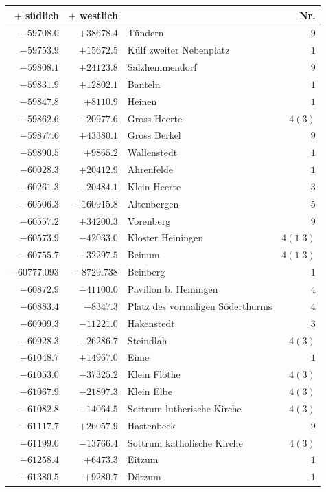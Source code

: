 \begin{center}\begingroup\fontsize{8}{9}\selectfont
\setlength{\tabcolsep}{4pt}
\begin{tabular}{r|r|p{170pt}|r}\hline
\(+\) südlich&\(+\) westlich&&Nr.\\\hline
\(-59708.0\)&\(+38678.4\)&Tündern&\(9\)\\
\(-59753.9\)&\(+15672.5\)&Külf zweiter Nebenplatz&\(1\)\\
\(-59808.1\)&\(+24123.8\)&Salzhemmendorf&\(9\)\\
\(-59831.9\)&\(+12802.1\)&Banteln&\(1\)\\
\(-59847.8\)&\(+8110.9\)&Heinen&\(1\)\\
\(-59862.6\)&\(-20977.6\)&Gross Heerte&\(4 (3)\)\\
\(-59877.6\)&\(+43380.1\)&Gross Berkel&\(9\)\\
\(-59890.5\)&\(+9865.2\)&Wallenstedt&\(1\)\\
\(-60028.3\)&\(+20412.9\)&Ahrenfelde&\(1\)\\
\(-60261.3\)&\(-20484.1\)&Klein Heerte&\(3\)\\
\(-60506.3\)&\(+160915.8\)&Altenbergen&\(5\)\\
\(-60557.2\)&\(+34200.3\)&Vorenberg&\(9\)\\
\(-60573.9\)&\(-42033.0\)&Kloster Heiningen&\(4(1.3)\)\\
\(-60755.7\)&\(-32297.5\)&Beinum&\(4(1.3)\)\\
\(-60777.093\)&\(-8729.738\)&Beinberg&\(1\)\\
\(-60872.9\)&\(-41100.0\)&Pavillon b. Heiningen&\(4\)\\
\(-60883.4\)&\(-8347.3\)&Platz des vormaligen Söderthurms&\(4\)\\
\(-60909.3\)&\(-11221.0\)&Hakenstedt&\(3\)\\
\(-60928.3\)&\(-26286.7\)&Steindlah&\(4 (3)\)\\
\(-61048.7\)&\(+14967.0\)&Eime&\(1\)\\
\(-61053.0\)&\(-37325.2\)&Klein Flöthe&\(4 (3)\)\\
\(-61067.9\)&\(-21897.3\)&Klein Elbe&\(4 (3)\)\\
\(-61082.8\)&\(-14064.5\)&Sottrum lutherische Kirche&\(4 (3)\)\\
\(-61117.7\)&\(+26057.9\)&Hastenbeck&\(9\)\\
\(-61199.0\)&\(-13766.4\)&Sottrum katholische Kirche&\(4 (3)\)\\
\(-61258.4\)&\(+6473.3\)&Eitzum&\(1\)\\
\(-61380.5\)&\(+9280.7\)&Dötzum&\(1\)\\

\end{tabular}
\end{center}

